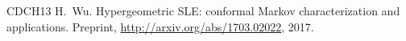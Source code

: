 \documentclass[oneside,english]{amsart}
\numberwithin{equation}{section}
\numberwithin{figure}{section}
\theoremstyle{plain}
\theoremstyle{plain}
\theoremstyle{plain}
\theoremstyle{remark}
\theoremstyle{plain}
\theoremstyle{plain}
\theoremstyle{plain}
\theoremstyle{plain}
\theoremstyle{plain}
\theoremstyle{plain}
\theoremstyle{plain}
\theoremstyle{plain}
\begin{document}
\begin{thebibliography}{CDCH{\etalchar{+}}13}
H.~Wu.
\newblock Hypergeometric {SLE}: conformal {M}arkov characterization and applications.
\newblock Preprint, \url{http://arxiv.org/abs/1703.02022}, 2017.



\end{thebibliography}
\end{document}
